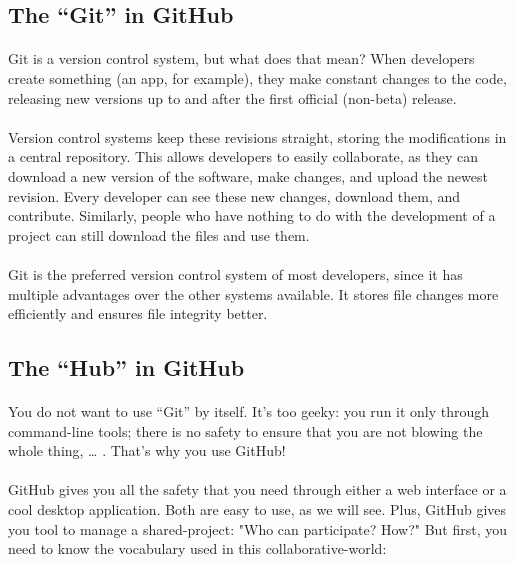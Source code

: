 \documentclass[a4paper,8pt]{article}
\begin{document}
\subsection{The “Git” in GitHub}
\paragraph{}
Git is a version control system, but what does that mean? When developers create something (an app, for example), they make constant changes to the code, releasing new versions up to and after the first official (non-beta) release.
\paragraph{}
Version control systems keep these revisions straight, storing the modifications in a central repository. This allows developers to easily collaborate, as they can download a new version of the software, make changes, and upload the newest revision. Every developer can see these new changes, download them, and contribute.
Similarly, people who have nothing to do with the development of a project can still download the files and use them. 
\paragraph{}
Git is the preferred version control system of most developers, since it has multiple advantages over the other systems available. It stores file changes more efficiently and ensures file integrity better.

\subsection{The “Hub” in GitHub}
\paragraph{}
You do not want to use “Git” by itself. It’s too geeky: you run it only through command-line tools; there is no safety to ensure that you are not blowing the whole thing, … . That’s why you use GitHub! 
\paragraph{}
GitHub gives you all the safety that you need through either a web interface or a cool desktop application. Both are easy to use, as we will see. Plus, GitHub gives you tool to manage a shared-project: "Who can participate? How?" But first, you need to know the vocabulary used in this collaborative-world:
\end{document}

